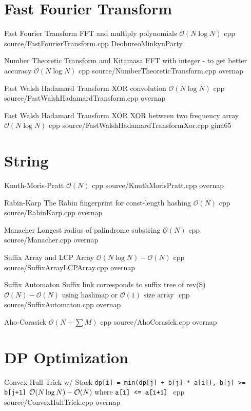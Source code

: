 \documentclass[landscape, 10pt, a4paper, oneside, twocolumn]{extarticle}
\begin{document}
\section{Fast Fourier Transform}

\Algorithm
{Fast Fourier Transform}
{FFT and multiply polynomials}
{$\mathcal{O}(N\log{N})$}
{cpp}
{source/FastFourierTransform.cpp}
{DeobureoMinkyuParty}

\Algorithm
{Number Theoretic Transform and Kitamasa}
{FFT with integer - to get better accuracy}
{$\mathcal{O}(N\log{N})$}
{cpp}
{source/NumberTheoreticTransform.cpp}
{overnap}

\Algorithm
{Fast Walsh Hadamard Transform}
{XOR convolution}
{$\mathcal{O}(N\log{N})$}
{cpp}
{source/FastWalshHadamardTransform.cpp}
{overnap}

\Algorithm
{Fast Walsh Hadamard Transform XOR}
{XOR between two frequency array}
{$\mathcal{O}(N\log{N})$}
{cpp}
{source/FastWalshHadamardTransformXor.cpp}
{gina65}

\section{String}

\Algorithm
{Knuth-Moris-Pratt}
{}
{$\mathcal{O}(N)$}
{cpp}
{source/KnuthMorisPratt.cpp}
{overnap}

\Algorithm
{Rabin-Karp}
{The Rabin fingerprint for const-length hashing}
{$\mathcal{O}(N)$}
{cpp}
{source/RabinKarp.cpp}
{overnap}

\Algorithm
{Manacher}
{Longest radius of palindrome substring}
{$\mathcal{O}(N)$}
{cpp}
{source/Manacher.cpp}
{overnap}

\Algorithm
{Suffix Array and LCP Array}
{}
{$\mathcal{O}(N\log{N})-\mathcal{O}(N)$}
{cpp}
{source/SuffixArrayLCPArray.cpp}
{overnap}

\Algorithm
{Suffix Automaton}
{Suffix link corresponds to suffix tree of rev(S)}
{$\mathcal{O}(N)-\mathcal{O}(N)\text{ using hashmap or $\mathcal{O}(1)$ size array }$}
{cpp}
{source/SuffixAutomaton.cpp}
{overnap}

\Algorithm
{Aho-Corasick}
{}
{$\mathcal{O}(N+\sum{M})$}
{cpp}
{source/AhoCorasick.cpp}
{overnap}


\section{DP Optimization}

\Algorithm
{Convex Hull Trick w/ Stack}
{\texttt{dp[i] = min(dp[j] + b[j] * a[i]), b[j] >= b[j+1]}}
{$\mathcal{O}(N\log{N})-\mathcal{O}(N)\text{ where \texttt{a[i] <= a[i+1]} }$}
{cpp}
{source/ConvexHullTrick.cpp}
{overnap}
\end{document}
